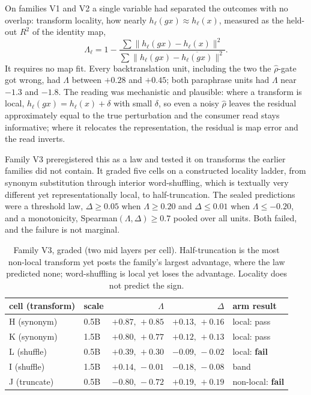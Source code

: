 \documentclass[11pt]{article}
\begin{document}
On families V1 and V2 a single variable had separated the outcomes with no
overlap: transform locality, how nearly $h_\ell(g x) \approx h_\ell(x)$,
measured as the held-out $R^2$ of the identity map,
\[
  \Lambda_\ell = 1 - \frac{\sum \lVert h_\ell(g x) - h_\ell(x)\rVert^2}
                          {\sum \lVert h_\ell(g x) - \overline{h_\ell(g x)}\rVert^2}.
\]
It requires no map fit. Every backtranslation unit, including the two the
$\hat\rho$-gate got wrong, had $\Lambda$ between $+0.28$ and $+0.45$; both
paraphrase units had $\Lambda$ near $-1.3$ and $-1.8$. The reading was
mechanistic and plausible: where a transform is local, $h_\ell(g x) = h_\ell(x)
+ \delta$ with small $\delta$, so even a noisy $\hat\rho$ leaves the residual
approximately equal to the true perturbation and the consumer read stays
informative; where it relocates the representation, the residual is map error
and the read inverts.

Family V3 preregistered this as a law and tested it on transforms the earlier
families did not contain. It graded five cells on a constructed locality ladder,
from synonym substitution through interior word-shuffling, which is textually
very different yet representationally local, to half-truncation. The sealed
predictions were a threshold law, $\Delta \ge 0.05$ when $\Lambda \ge 0.20$ and
$\Delta \le 0.01$ when $\Lambda \le -0.20$, and a monotonicity, Spearman$(\Lambda,
\Delta) \ge 0.7$ pooled over all units. Both failed, and the failure is not
marginal.

\begin{table}[t]
  \centering
  \small
  \begin{tabular}{llrrl}
    \toprule
    cell (transform) & scale & $\Lambda$ & $\Delta$ & arm result \\
    \midrule
    H (synonym)   & 0.5B & $+0.87,\,+0.85$ & $+0.13,\,+0.16$ & local: pass \\
    K (synonym)   & 1.5B & $+0.80,\,+0.77$ & $+0.12,\,+0.13$ & local: pass \\
    L (shuffle)   & 0.5B & $+0.39,\,+0.30$ & $-0.09,\,-0.02$ & local: \textbf{fail} \\
    I (shuffle)   & 1.5B & $+0.14,\,-0.01$ & $-0.18,\,-0.08$ & band \\
    J (truncate)  & 0.5B & $-0.80,\,-0.72$ & $+0.19,\,+0.19$ & non-local: \textbf{fail} \\
    \bottomrule
  \end{tabular}
  \caption{Family V3, graded (two mid layers per cell). Half-truncation is the
  most non-local transform yet posts the family's largest advantage, where the
  law predicted none; word-shuffling is local yet loses the advantage. Locality
  does not predict the sign.}
  \label{tab:v3}
\end{table}
\end{document}
